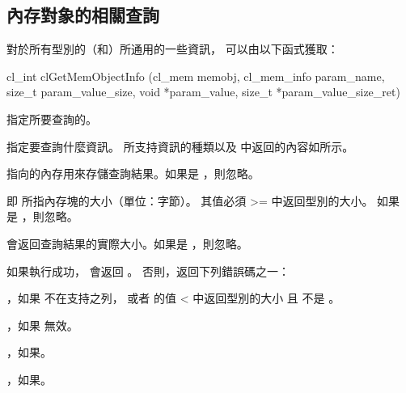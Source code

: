 \subsection[sec:memObjQuery]{內存對象的相關查詢}

對於所有型別的（和）所通用的一些資訊，
可以由以下函式獲取：


\startCLFUNC
cl_int clGetMemObjectInfo (cl_mem memobj,
			cl_mem_info param_name,
			size_t param_value_size,
			void *param_value,
			size_t *param_value_size_ret)
\stopCLFUNC

 指定所要查詢的。

 指定要查詢什麼資訊。
所支持資訊的種類以及  中返回的內容如所示。

 指向的內存用來存儲查詢結果。如果是 ，則忽略。

 即  所指內存塊的大小（單位：字節）。
其值必須 >= 中返回型別的大小。
如果  是 ，則忽略。

 會返回查詢結果的實際大小。如果是 ，則忽略。

如果執行成功， 會返回 。
否則，返回下列錯誤碼之一：
\startigBase
\item {}，如果  不在支持之列，
或者  的值 < 中返回型別的大小
且  不是 。

\item {}，如果  無效。
\item {}，如果\scdevfailres。
\item {}，如果\schostfailres。
\stopigBase

{}
